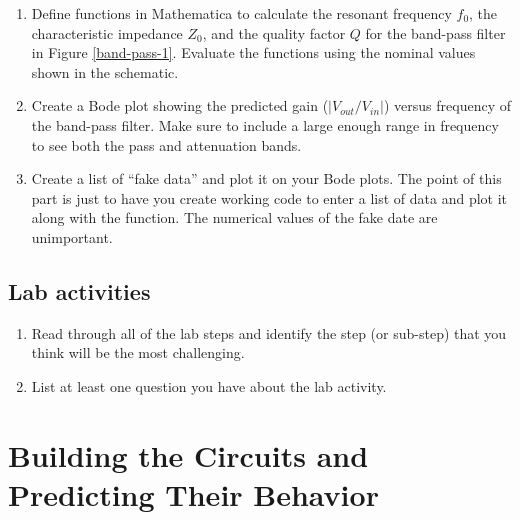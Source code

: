 \documentclass[10pt]{PhysLab1C} %
\begin{document}
\begin{enumerate}
\def\labelenumi{\arabic{enumi}.}
\item
  Define functions in Mathematica to calculate the resonant frequency
  $f_0$, the characteristic
  impedance $Z_0$, and the quality factor $Q$ for the band-pass filter in
  Figure \ref{band-pass-1}. Evaluate the
  functions using the nominal values shown in the schematic.
\item
  Create a Bode plot showing the predicted gain (\(|V_{out}/V_{in}|\))
  versus frequency of the band-pass filter. Make sure to include a large
  enough range in frequency to see both the pass
  and attenuation bands.
\item
  Create a list of ``fake data'' and plot it on your Bode plots. The
  point of this part is just to
  have you create working code to enter a list of data and plot it along
  with the function.
  The numerical values of the fake date are unimportant.
\end{enumerate}

\subsection{Lab activities}


\begin{enumerate}
\def\labelenumi{\arabic{enumi}.}
\item
  Read through all of the lab steps and identify the step (or sub-step)
  that you think will be the most challenging.
\item
  List at least one question you have about the lab activity.
\end{enumerate}



\section{Building the Circuits and Predicting Their Behavior}
\end{document}
